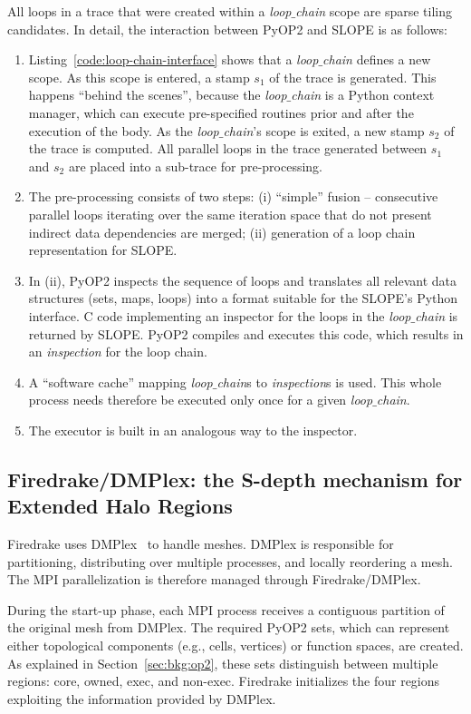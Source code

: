 All loops in a trace that were created within a {\em loop$\_$chain} scope are sparse tiling candidates. In detail, the interaction between PyOP2 and SLOPE is as follows:
\begin{enumerate}
\item Listing~\ref{code:loop-chain-interface} shows that a {\em loop$\_$chain} defines a new scope. As this scope is entered, a stamp $s_1$ of the trace is generated. This happens ``behind the scenes'', because the {\em loop$\_$chain} is a Python context manager, which can execute pre-specified routines prior and after the execution of the body. As the {\em loop$\_$chain}'s scope is exited, a new stamp $s_2$ of the trace is computed. All parallel loops in the trace generated between $s_1$ and $s_2$ are placed into a sub-trace for pre-processing.
\item The pre-processing consists of two steps: (i) ``simple'' fusion -- consecutive parallel loops iterating over the same iteration space that do not present indirect data dependencies are merged; (ii) generation of a loop chain representation for SLOPE.
\item In (ii), PyOP2 inspects the sequence of loops and translates all relevant data structures (sets, maps, loops) into a format suitable for the SLOPE's Python interface. C code implementing an inspector for the loops in the {\em loop$\_$chain} is returned by SLOPE. PyOP2 compiles and executes this code, which results in an {\em inspection} for the loop chain.
\item A ``software cache'' mapping {\em loop$\_$chain}s to {\em inspection}s is used. This whole process needs therefore be executed only once for a given {\em loop$\_$chain}. 
\item The executor is built in an analogous way to the inspector.
\end{enumerate}


\subsection{Firedrake/DMPlex: the S-depth mechanism for Extended Halo Regions}
\label{sec:tiling:impl-firedrake}
Firedrake uses DMPlex~\citep{dmplex-cite} to handle meshes. DMPlex is responsible for partitioning, distributing over multiple processes, and locally reordering a mesh. The MPI parallelization is therefore managed through Firedrake/DMPlex.

During the start-up phase, each MPI process receives a contiguous partition of the original mesh from DMPlex. The required PyOP2 sets, which can represent either topological components (e.g., cells, vertices) or function spaces, are created. As explained in Section~\ref{sec:bkg:op2}, these sets distinguish between multiple regions: core, owned, exec, and non-exec. Firedrake initializes the four regions exploiting the information provided by DMPlex. 

